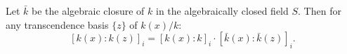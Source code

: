 Let $\bar{k}$ be the algebraic closure of $k$ in the algebraically closed field $S$. Then for any transcendence basis $\{z\}$ of $k(x)/k$:
$$[k(x):k(z)]_i = [k(x):k]_i \cdot [\bar{k}(x):\bar{k}(z)]_i.$$
